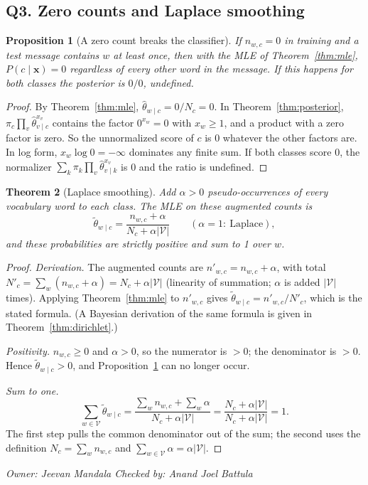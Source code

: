\documentclass[11pt]{article}
\newcommand{\owner}[2]{\par\noindent\textit{Owner: #1 \hfill Checked by: #2}\par\medskip}
\theoremstyle{plain}
\newtheorem{theorem}{Theorem}
\newtheorem{proposition}[theorem]{Proposition}
\theoremstyle{definition}
\newcommand{\V}{\mathcal{V}}
\newcommand{\Vs}{|\mathcal{V}|}
\newcommand{\bx}{\mathbf{x}}
\begin{document}
\subsection{Q3. Zero counts and Laplace smoothing}\label{sec:q3}

\begin{proposition}[A zero count breaks the classifier]\label{prop:zero}
If $n_{w,c}=0$ in training and a test message contains $w$ at least once, then with the MLE
of Theorem~\ref{thm:mle}, $P(c\mid\bx)=0$ regardless of every other word in the message.
If this happens for both classes the posterior is $0/0$, undefined.
\end{proposition}
\begin{proof}
By Theorem~\ref{thm:mle}, $\hat\theta_{w\mid c}=0/N_c=0$. In Theorem~\ref{thm:posterior},
$\pi_c\prod_v\hat\theta_{v\mid c}^{x_v}$ contains the factor $0^{x_w}=0$ with $x_w\ge 1$, and a
product with a zero factor is zero. So the unnormalized score of $c$ is 0 whatever the other
factors are. In log form, $x_w\log 0=-\infty$ dominates any finite sum. If both classes score
0, the normalizer $\sum_k\pi_k\prod_v\hat\theta_{v\mid k}^{x_v}$ is 0 and the ratio is
undefined.
\end{proof}

\begin{theorem}[Laplace smoothing]\label{thm:laplace}
Add $\alpha>0$ pseudo-occurrences of every vocabulary word to each class. The MLE on these
augmented counts is
\[
\tilde\theta_{w\mid c}=\frac{n_{w,c}+\alpha}{N_c+\alpha\Vs}\qquad(\alpha=1:\ \text{Laplace}),
\]
and these probabilities are strictly positive and sum to 1 over $w$.
\end{theorem}
\begin{proof}
\textit{Derivation.} The augmented counts are $n'_{w,c}=n_{w,c}+\alpha$, with total
$N'_c=\sum_w(n_{w,c}+\alpha)=N_c+\alpha\Vs$ (linearity of summation; $\alpha$ is added
$\Vs$ times). Applying Theorem~\ref{thm:mle} to $n'_{w,c}$ gives
$\tilde\theta_{w\mid c}=n'_{w,c}/N'_c$, which is the stated formula. (A Bayesian derivation
of the same formula is given in Theorem~\ref{thm:dirichlet}.)

\textit{Positivity.} $n_{w,c}\ge 0$ and $\alpha>0$, so the numerator is $>0$; the denominator
is $>0$. Hence $\tilde\theta_{w\mid c}>0$, and Proposition~\ref{prop:zero} can no longer occur.

\textit{Sum to one.}
\[
\sum_{w\in\V}\tilde\theta_{w\mid c}
=\frac{\sum_w n_{w,c}+\sum_w\alpha}{N_c+\alpha\Vs}
=\frac{N_c+\alpha\Vs}{N_c+\alpha\Vs}=1.
\]
The first step pulls the common denominator out of the sum; the second uses the definition
$N_c=\sum_wn_{w,c}$ and $\sum_{w\in\V}\alpha=\alpha\Vs$.
\end{proof}
\owner{Jeevan Mandala}{Anand Joel Battula}
\end{document}
